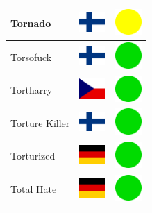 \documentclass[12pt, a4paper, twoside]{report}
\begin{document}
\begin{center}
\begin{longtable}{|p{5cm}|p{2cm}|p{2cm}|}
 Tornado                                                    & \includegraphics[width=1cm]{../img/flags/fi} &   \includegraphics[width=1cm]{../likes/m} \\ \hline
 Torsofuck                                                  & \includegraphics[width=1cm]{../img/flags/fi} &   \includegraphics[width=1cm]{../likes/y} \\ \hline
 Tortharry                                                  & \includegraphics[width=1cm]{../img/flags/cz} &   \includegraphics[width=1cm]{../likes/y} \\ \hline
 Torture Killer                                             & \includegraphics[width=1cm]{../img/flags/fi} &   \includegraphics[width=1cm]{../likes/y} \\ \hline
 Torturized                                                 & \includegraphics[width=1cm]{../img/flags/de} &   \includegraphics[width=1cm]{../likes/y} \\ \hline
 Total Hate                                                 & \includegraphics[width=1cm]{../img/flags/de} &   \includegraphics[width=1cm]{../likes/y} \\ \hline

\end{longtable}
\end{center}
\end{document}
